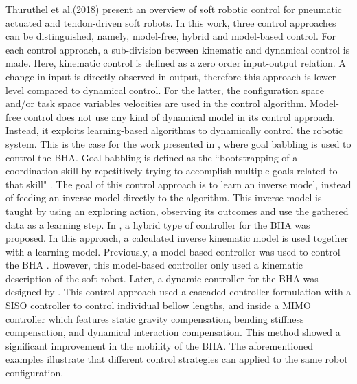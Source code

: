 Thuruthel et al.(2018) \cite{george2018control} present an overview of soft robotic control for pneumatic actuated and tendon-driven soft robots. In this work, three control approaches can be distinguished, namely, model-free, hybrid and model-based control. For each control approach, a sub-division between kinematic and dynamical control is made. Here, kinematic control is defined as a zero order input-output relation. A change in input is directly observed in output, therefore this approach is lower-level compared to dynamical control. For the latter, the configuration space and/or task space variables velocities are used in the control algorithm. Model-free control does not use any kind of dynamical model in its control approach. Instead, it exploits learning-based algorithms to dynamically control the robotic system. This is the case for the work presented in \cite{rolf2013efficient}, where goal babbling is used to control the BHA. Goal babbling is defined as the ``bootstrapping of a coordination skill by repetitively trying to accomplish multiple goals related to that skill" \cite{rolf2012goal}. The goal of this control approach is to learn an inverse model, instead of feeding an inverse model directly to the algorithm. This inverse model is taught by using an exploring action, observing its outcomes and use the gathered data as a learning step. In \cite{reinhart2017hybrid}, a hybrid type of controller for the BHA was proposed. In this approach, a calculated inverse kinematic model is used together with a learning model. Previously, a model-based controller was used to control the BHA \cite{mahl2014bhakin}. However, this model-based controller only used a kinematic description of the soft robot. Later, a dynamic controller for the BHA was designed by \cite{falkenhahn2016dynamic}. This control approach used a cascaded controller formulation with a SISO controller to control individual bellow lengths, and inside a MIMO controller which features static gravity compensation, bending stiffness compensation, and dynamical interaction compensation. This method showed a significant improvement in the mobility of the BHA. The aforementioned examples illustrate that different control strategies can applied to the same robot configuration. 













